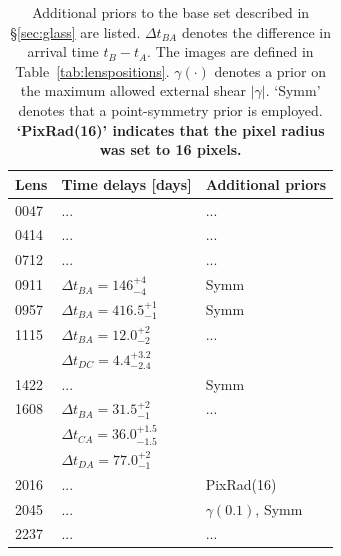\documentclass[useAMS,usenatbib]{mn2e}
\newcommand{\cb}[1]{{\color{red} \textbf{#1}}}
\begin{document}
\begin{table}
  \begin{center}
    \begin{tabular}{l l l}
      Lens & Time delays [days] & Additional priors \\ \hline
      0047 & ... & ...\\
      0414 & ... & ...\\
      0712 & ... & ...\\
      0911 & $\Delta t_{BA}=146^{+4}_{-4}$ & Symm\\
      0957 & $\Delta t_{BA}=416.5^{+1}_{-1}$ & Symm \\
      1115 & $\Delta t_{BA}=12.0^{+2}_{-2}$ & ...\\
           & $\Delta t_{DC}=4.4^{+3.2}_{-2.4}$ & \\
      1422 & ... & Symm \\
      1608 & $\Delta t_{BA}=31.5^{+2}_{-1}$ & ...\\
           & $\Delta t_{CA}=36.0^{+1.5}_{-1.5}$ & \\
           & $\Delta t_{DA}=77.0^{+2}_{-1}$ & \\
      2016 & ... & PixRad(16) \\
      2045 & ... & $\gamma(0.1)$, Symm \\
      2237 & ... & ...\\
    \end{tabular}
    \caption[width=\linewidth]{Additional priors to the base set described in \S\ref{sec:glass} are listed. $\Delta t_{BA}$ denotes the difference in arrival time $t_{B}-t_{A}$. The images are defined in Table~\ref{tab:lenspositions}. $\gamma(\cdot)$ denotes a prior on the maximum allowed external shear $|\gamma|$. `Symm' denotes that a point-symmetry prior is employed. \cb{`PixRad(16)' indicates that the pixel radius was set to 16 pixels.}}
    \label{tab:lenspriors}
  \end{center}
\end{table}
\end{document}
